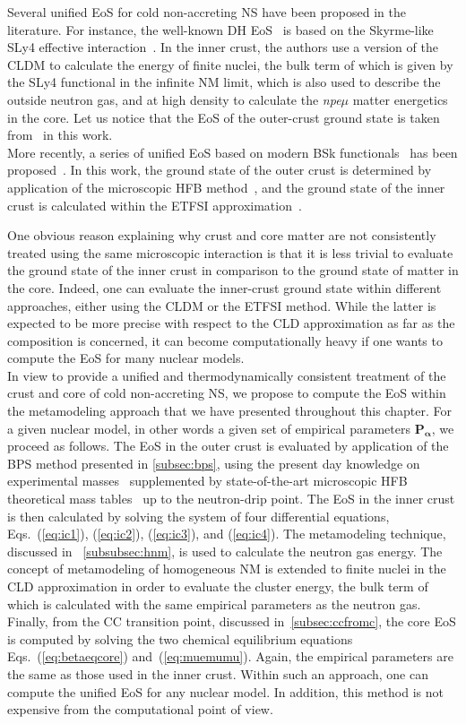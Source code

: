 Several unified EoS for cold non-accreting NS have been proposed in the 
literature. For instance, the 
well-known DH EoS~\cite{Douchin2001} is based on the Skyrme-like SLy4 effective
interaction~\cite{Chabanat1998}. In the inner crust, the authors use a version 
of the CLDM to calculate the energy of finite nuclei, the bulk term of which is 
given by the SLy4 functional in the infinite NM limit, which is also used to 
describe the outside neutron gas, and at high density to calculate 
the \textit{npe$\mu$} matter energetics in the core. Let us notice that the EoS
of the outer-crust ground state is taken from~\cite{Haensel1994} in this 
work.\\
More recently, a series of unified EoS based on modern BSk 
functionals~\cite{Goriely2013} has been proposed~\cite{Pearson2018}. In this
work, the ground state of the outer crust is determined by application of the
microscopic HFB method~\cite{Samyn2002}, and the ground state of the inner 
crust is calculated within the ETFSI approximation~\cite{Onsi2008}.

One obvious reason explaining why crust and core matter are not consistently 
treated using the same microscopic interaction is that it is less trivial to 
evaluate the ground state of the inner crust in comparison to the ground state
of matter in the core. Indeed, one can evaluate the inner-crust ground state
within different approaches, either using the CLDM or the ETFSI method. While 
the latter is expected to be more precise with respect to the CLD 
approximation as far as the composition is concerned, it can become 
computationally heavy if one wants to compute the EoS for many nuclear 
models.\\
In view to provide a unified and thermodynamically consistent treatment of the
crust and core of cold non-accreting NS, we propose to compute the EoS within 
the metamodeling approach that we have presented throughout this chapter. For
a given nuclear model, in other words a given set of empirical parameters
$\bm{P_\alpha}$, we proceed as follows. The EoS in the outer crust is
evaluated by application of the BPS method presented in \ref{subsec:bps}, using 
the present day knowledge on experimental masses~\cite{Huang2017} supplemented 
by state-of-the-art microscopic HFB theoretical mass tables~\cite{Goriely2013} 
up to the neutron-drip point. The EoS in the inner crust is then calculated
by solving the system of four differential equations, Eqs.~(\ref{eq:ic1}),
(\ref{eq:ic2}), (\ref{eq:ic3}), and (\ref{eq:ic4}). The metamodeling technique,
discussed in ~\ref{subsubsec:hnm}, is used to calculate the neutron gas energy.
The concept of metamodeling of homogeneous NM is extended to finite nuclei in the
CLD approximation in order to evaluate the cluster energy, the bulk term of
which is calculated with the same empirical parameters as the neutron gas. 
Finally, from the CC transition point, discussed in~\ref{subsec:ccfromc}, the 
core EoS is computed by solving the two chemical equilibrium equations
Eqs.~(\ref{eq:betaeqcore}) and~(\ref{eq:muemumu}). Again, the empirical
parameters are the same as those used in the inner crust. Within such an 
approach, one can compute the unified EoS for any nuclear model.
In addition, this method is not expensive from the computational point of view. 

